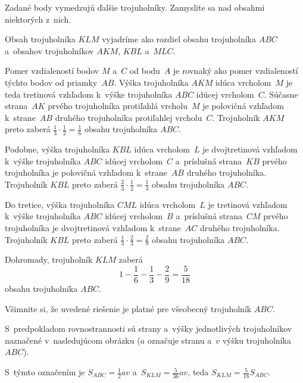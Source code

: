 {%
\napad
Zadané body vymedzujú ďalšie trojuholníky.
Zamyslite sa nad obsahmi niektorých z~nich.

\riesenie
Obsah trojuholníka $KLM$ vyjadríme ako rozdiel obsahu trojuholníka $ABC$ a~obsahov trojuholníkov $AKM$, $KBL$ a~$MLC$.
%


Pomer vzdialeností bodov $M$ a~$C$ od bodu~$A$ je rovnaký ako pomer vzdialeností týchto bodov od priamky~$AB$.
Výška trojuholníka $AKM$ idúca vrcholom~$M$ je teda tretinová vzhľadom k~výške trojuholníka $ABC$ idúcej vrcholom~$C$.
Súčasne strana~$AK$ prvého trojuholníka protiľahlá vrcholu~$M$ je polovičná vzhľadom k~strane~$AB$ druhého trojuholníka protiľahlej vrcholu~$C$.
Trojuholník $AKM$ preto zaberá $\frac13\cdot\frac12=\frac16$ obsahu trojuholníka $ABC$.

Podobne, výška trojuholníka $KBL$ idúca vrcholom~$L$ je dvojtretinová vzhľadom k~výške trojuholníka $ABC$ idúcej vrcholom~$C$ a~príslušná strana~$KB$ prvého trojuholníka je polovičná vzhľadom k~strane~$AB$ druhého trojuholníka.
Trojuholník $KBL$ preto zaberá $\frac23\cdot\frac12=\frac13$ obsahu trojuholníka $ABC$.

Do tretice, výška trojuholníka $CML$ idúca vrcholom~$L$ je tretinová vzhľadom k~výške trojuholníka $ABC$ idúcej vrcholom~$B$ a~príslušná strana~$CM$ prvého trojuholníka je dvojtretinová vzhľadom k~strane~$AC$ druhého trojuholníka.
Trojuholník $KBL$ preto zaberá $\frac13\cdot\frac23=\frac29$ obsahu trojuholníka $ABC$.

Dohromady, trojuholník $KLM$ zaberá
$$
1-\frac16-\frac13-\frac29=\frac{5}{18}
$$
obsahu trojuholníka $ABC$.

\poznamka
Všimnite si, že uvedené riešenie je platné pre všeobecný trojuholník $ABC$.

S~predpokladom rovnostrannosti sú strany a~výšky jednotlivých trojuholníkov naznačené v~nasledujúcom obrázku ($a$ označuje stranu a~$v$ výšku trojuholníka $ABC$).
%


S~týmto označením je $S_{ABC}=\frac12av$ a~$S_{KLM}=\frac{5}{36}av$, teda $S_{KLM}=\frac5{18}S_{ABC}$.

}

